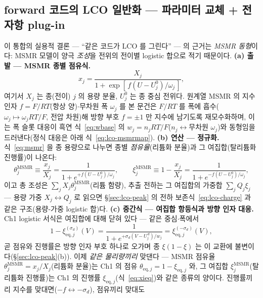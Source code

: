 \documentclass[11pt,a4paper]{article}
\newcommand{\eq}{\mathrm{eq}}
\begin{document}
\subsection{forward 코드의 LCO 일반화 — 파라미터 교체 + 전자항 plug-in}\label{sec:lco-code}
이 통합의 실용적 결론 — ``같은 코드가 LCO 를 그린다'' — 의 근거는 \emph{MSMR 동형}이다:
MSMR 모델\cite{msmr2024}이 양극 \emph{조성}을 전위의 전이별 logistic
합으로 적기 때문이다.
\textbf{(a) 출발 — MSMR 종별 점유식.}
\begin{equation}
x_j=\frac{X_j}{1+\exp[\,f(U-U_j^0)/\omega_j\,]},
\label{eq:msmr}
\end{equation}
여기서 $X_j$ 는 종(전이) $j$ 의 용량 분율, $U_j^0$ 는 종 중심 전위다. 원계열 MSMR 의 지수 인자
$f=F/RT$(항상 양)$\cdot$무차원 폭 $\omega_j$ 를 본 문건은 $F/RT$ 를 폭에 흡수($\omega_j\mapsto\omega_jRT/F$,
전압 차원)해 방향 부호 $f=\pm1$ 만 지수에 남기도록 재모수화하며, 이는 폭 슬롯 대응이 흑연
식~\eqref{eq:wbase} 의 $w_j=n_jRT/F$($n_j\leftrightarrow$무차원 $\omega_j$)와 동형임을 드러낸다(정식
대응은 아래 식~\eqref{eq:lco-msmrmap}).
\textbf{(b) 연산 — 정규화.} 식~\eqref{eq:msmr} 을 종 용량으로 나누면
종별 \emph{점유율}(리튬화 분율)과 그 여집합(탈리튬화 진행률)이 나온다:
\begin{equation}
\theta_j^{\mathrm{MSMR}}\equiv\frac{x_j}{X_j}=\frac{1}{1+e^{+f(U-U_j^0)/\omega_j}},\qquad
\xi_j^{\mathrm{MSMR}}\equiv1-\frac{x_j}{X_j}=\frac{1}{1+e^{-f(U-U_j^0)/\omega_j}},
\label{eq:lco-msmrnorm}
\end{equation}
이고 총 조성은 $\sum_jX_j\theta_j^{\mathrm{MSMR}}$(리튬 함량), 추출 전하는 그 여집합의 가중합
$\sum_jQ_j\xi_j$ — 용량 가중 $X_j\!\leftrightarrow\!Q_j$ 로 읽으면 \S\ref{sec:lco-peak} 의 전하
보존식~\eqref{eq:lco-charge} 과 같은 구조(용량-가중 logistic 합)다.
\textbf{(c) 중간식 — 여집합 항등식과 방향 인자 대응.} Ch1 logistic 서식은 여집합에 대해 닫혀 있다 —
같은 중심$\cdot$폭에서
\begin{equation}
1-\xi_{\eq,j}^{(\sigma_d)}(V)
=\frac{1}{1+e^{+\sigma_d(V-U_j^{\,d})/w_j}}
=\xi_{\eq,j}^{(-\sigma_d)}(V),
\label{eq:lco-comp}
\end{equation}
곧 점유와 진행률은 방향 인자 부호 하나로 오가며 종 $\xi(1-\xi)$ 는 이 교환에 불변이다(\S\ref{sec:lco-peak}(b)). 이제 \emph{같은 물리량끼리} 맞댄다 — MSMR 점유율
$\theta_j^{\mathrm{MSMR}}=x_j/X_j$(리튬화 분율)는 Ch1 의 점유 $\theta_{\eq,j}=1-\xi_{\eq,j}$ 와, 그 여집합
$\xi_j^{\mathrm{MSMR}}$(탈리튬화 진행률)는 Ch1 의 진행률 $\xi_{\eq,j}$(식~\eqref{eq:xieq})와 같은 종류의
양이다. 진행률끼리 지수를 맞대면($-f\leftrightarrow-\sigma_d$), 점유끼리 맞대도
\end{document}
